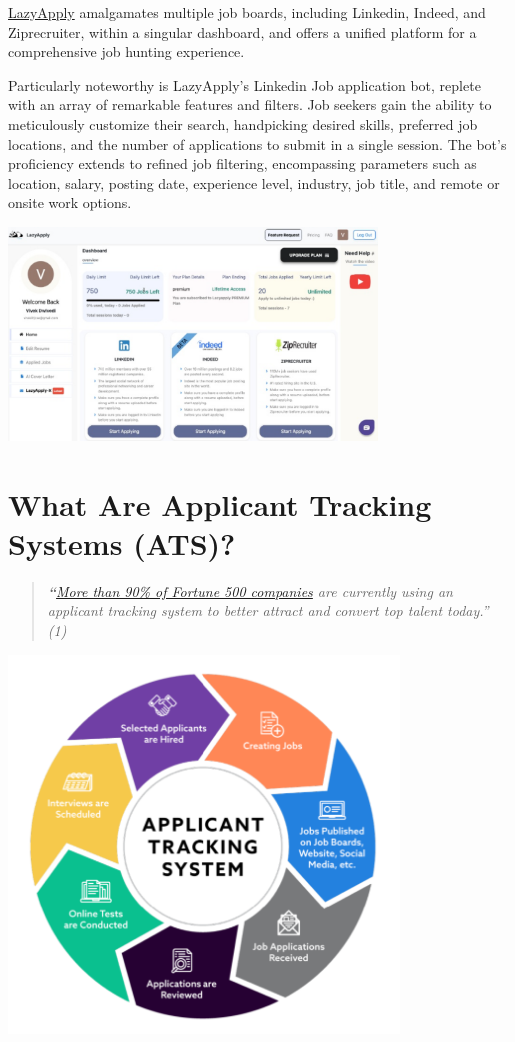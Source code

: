 \documentclass[
]{book}
\begin{document}
\href{https://lazyapply.com/}{LazyApply} amalgamates multiple job boards, including Linkedin, Indeed, and Ziprecruiter, within a singular dashboard, and offers a unified platform for a comprehensive job hunting experience.

Particularly noteworthy is LazyApply's Linkedin Job application bot, replete with an array of remarkable features and filters. Job seekers gain the ability to meticulously customize their search, handpicking desired skills, preferred job locations, and the number of applications to submit in a single session. The bot's proficiency extends to refined job filtering, encompassing parameters such as location, salary, posting date, experience level, industry, job title, and remote or onsite work options.~

\includegraphics[width=3.85417in,height=\textheight]{lazyapply pic 2.png}

\hypertarget{what-are-applicant-tracking-systems-ats}{%
\chapter{What Are Applicant Tracking Systems (ATS)?}\label{what-are-applicant-tracking-systems-ats}}

\begin{quote}
\emph{\textbf{``}\href{https://medium.com/swlh/90-of-fortune-500-companies-use-an-applicant-tracking-system-whats-it-5a6b6d25e5e7}{More than 90\% of Fortune 500 companies} are currently using an applicant tracking system to better attract and convert top talent today.'' (1)}
\end{quote}

\includegraphics[width=4.08333in,height=\textheight]{ats pic.png}
\end{document}
